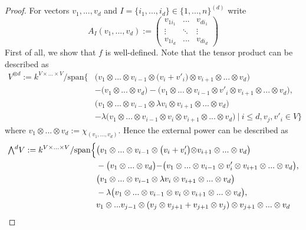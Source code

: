 \documentclass{scrartcl}
\newcommand{\extpow}{\mathchoice{{\textstyle\bigwedge}}
    {{\bigwedge}}
    {{\textstyle\wedge}}
    {{\scriptstyle\wedge}}}
\newcommand{\vspan}{\mathrm{span}}
\begin{document}
\begin{proof}
    For vectors $v_1, ..., v_d$ and $I = \{i_1, ..., i_d\} \in \{1, ..., n\}^{(d)}$ write
    \begin{equation*}
        A_I(v_1, ..., v_d) := \left(\begin{matrix*}
            v_{1i_1} & ... & v_{di_1} \\
            \vdots & \ddots & \vdots \\
            v_{1i_d} & ... & v_{di_d}
        \end{matrix*}\right)
    \end{equation*}
    First of all, we show that $f$ is well-defined.
    Note that the tensor product can be described as
    \begin{align*}
        V^{\otimes d} := k^{V \times ...\times V} / \vspan\{ &\bigl(v_1 \otimes ... \otimes v_{i - 1} \otimes \bigl(v_i + v'_i\bigl) \otimes v_{i + 1} \otimes ... \otimes v_d\bigl) \\
        &- \bigl(v_1 \otimes ... \otimes v_d\bigl) - \bigl(v_1 \otimes ... \otimes v_{i - 1} \otimes v'_i \otimes v_{i + 1} \otimes ... \otimes v_d\bigl), \\
        & \bigl(v_1 \otimes ... \otimes v_{i - 1} \otimes \lambda v_i \otimes v_{i + 1} \otimes ... \otimes v_d\bigl) \\
        &- \lambda\bigl(v_1 \otimes ... \otimes v_{i - 1} \otimes v_i \otimes v_{i + 1} \otimes ... \otimes v_d\bigl) \ | \ i \leq d, v_j, v'_i \in V\}
    \end{align*}
    where $v_1 \otimes ... \otimes v_d := \chi_{(v_1, ..., v_d)}$.
    Hence the external power can be described as
    \begin{align*}
        \extpow^d V := k^{V \times ... \times V} / \vspan\Bigl\{ &\bigl(v_1 \otimes ... \otimes v_{i - 1} \otimes \bigl(v_i + v'_i\bigl) \otimes v_{i + 1} \otimes ... \otimes v_d\bigl) \\
        &- \bigl(v_1 \otimes ... \otimes v_d\bigl) - \bigl(v_1 \otimes ... \otimes v_{i - 1} \otimes v'_i \otimes v_{i + 1} \otimes ... \otimes v_d\bigl), \\
        & \bigl(v_1 \otimes ... \otimes v_{i - 1} \otimes \lambda v_i \otimes v_{i + 1} \otimes ... \otimes v_d\bigl) \\
        &- \lambda\bigl(v_1 \otimes ... \otimes v_{i - 1} \otimes v_i \otimes v_{i + 1} \otimes ... \otimes v_d\bigl), \\
        &v_1 \otimes ... v_{j - 1} \otimes (v_j \otimes v_{j + 1} + v_{j + 1} \otimes v_j) \otimes v_{j + 1} \otimes ... \otimes v_d \\

\end{align*}
\end{proof}
\end{document}
